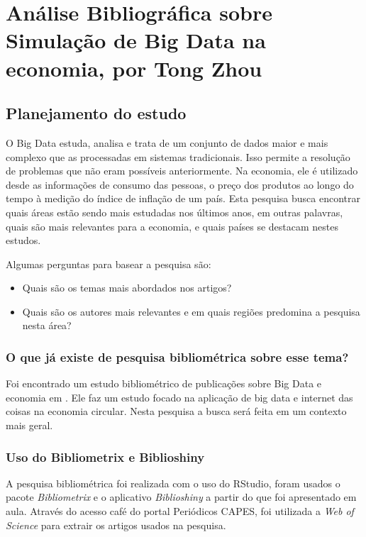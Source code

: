 \chapter{Análise Bibliográfica sobre Simulação de Big Data na economia, por Tong Zhou\label{chap:bibliometria:Tong00020}}


\section{Planejamento do estudo}

O Big Data estuda, analisa e trata de um conjunto de dados maior e mais complexo que as processadas em sistemas tradicionais. Isso permite a resolução de problemas que não eram possíveis anteriormente.
Na economia, ele é utilizado desde as informações de consumo das pessoas, o preço dos produtos ao longo do tempo à medição do índice de inflação de um país.
Esta pesquisa busca encontrar quais áreas estão sendo mais estudadas nos últimos anos, em outras palavras, quais são mais relevantes para a economia, e quais países se destacam nestes estudos.

Algumas perguntas para basear a pesquisa são:
\begin{itemize}
    \item Quais são os temas mais abordados nos artigos?
    \item Quais são os autores mais relevantes e em quais regiões predomina a pesquisa nesta área?
\end{itemize}


\subsection{O que já existe de pesquisa bibliométrica sobre esse tema?}
 Foi encontrado um estudo bibliométrico de publicações sobre Big Data e economia em  \cite{nobre_scientific_2017}. Ele faz um estudo focado na aplicação de big data e internet das coisas na economia circular. Nesta pesquisa a busca será feita em um contexto mais geral. 


\subsection{Uso do Bibliometrix e Biblioshiny}

A pesquisa bibliométrica foi realizada com o uso do RStudio, foram usados o pacote \textit{Bibliometrix} e o aplicativo \textit{Biblioshiny} a partir do que foi apresentado em aula. Através do acesso café do portal Periódicos CAPES, foi utilizada a \textit{Web of Science} para extrair os artigos usados na pesquisa.


